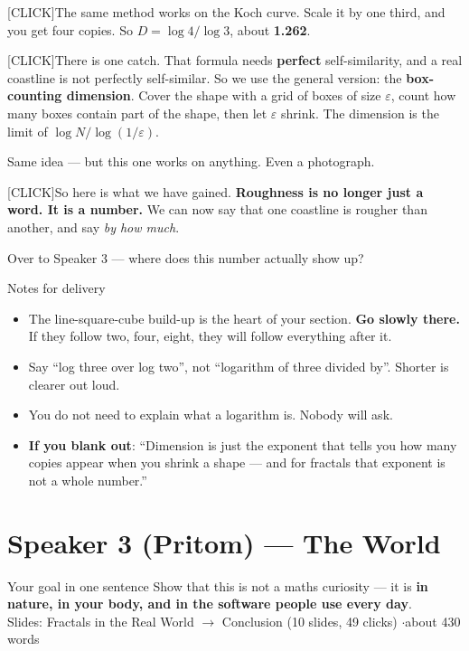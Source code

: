 \documentclass[12pt,a4paper]{article}
\newcommand{\cue}{\textcolor{RayColor}{\textsf{\footnotesize[CLICK]}}\hspace{0.3em}}
\newcommand{\stress}[1]{\textbf{#1}}
\begin{document}
\cue The same method works on the Koch curve. Scale it by one third, and you get
four copies. So $D = \log 4 / \log 3$, about \stress{1.262}.

\cue There is one catch. That formula needs \stress{perfect} self-similarity, and
a real coastline is not perfectly self-similar. So we use the general version: the
\stress{box-counting dimension}. Cover the shape with a grid of boxes of size
$\varepsilon$, count how many boxes contain part of the shape, then let
$\varepsilon$ shrink. The dimension is the limit of
$\log N / \log(1/\varepsilon)$.

Same idea --- but this one works on anything. Even a photograph.

\cue So here is what we have gained. \stress{Roughness is no longer just a word.
It is a number.} We can now say that one coastline is rougher than another, and
say \emph{by how much}.

Over to Speaker 3 --- where does this number actually show up?

\begin{notebox}{Notes for delivery}
  \begin{itemize}[leftmargin=1.2em, itemsep=2pt, topsep=2pt]
    \item The line-square-cube build-up is the heart of your section. \stress{Go
      slowly there.} If they follow two, four, eight, they will follow everything
      after it.
    \item Say ``log three over log two'', not ``logarithm of three divided by''.
      Shorter is clearer out loud.
    \item You do not need to explain what a logarithm is. Nobody will ask.
    \item \stress{If you blank out}: ``Dimension is just the exponent that tells you
      how many copies appear when you shrink a shape --- and for fractals that
      exponent is not a whole number.''
  \end{itemize}
\end{notebox}

\newpage
\section*{Speaker 3 (Pritom) --- The World}

\begin{speakerbox}{Your goal in one sentence}
  Show that this is not a maths curiosity --- it is \stress{in nature, in your body,
  and in the software people use every day}.\\[4pt]
  {\small\color{DarkGray} Slides: Fractals in the Real World $\rightarrow$
  Conclusion (10 slides, 49 clicks) \quad$\cdot$\quad about 430 words}
\end{speakerbox}
\end{document}
